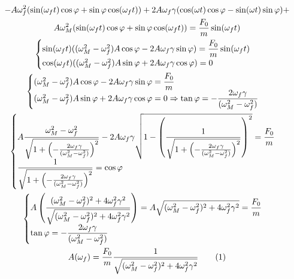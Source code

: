 \documentclass{article}
\numberwithin{equation}{subsection}
\begin{document}
\begin{gather*}
    -A\omega_f^{2}(\sin(\omega_f t)\cos\varphi+\sin\varphi \cos(\omega_f t))+
    2A\omega_f\gamma(\cos(\omega t)\cos\varphi-\sin(\omega t)\sin\varphi)+\\
    A\omega_M^{2}(\sin(\omega_f t)\cos\varphi+\sin\varphi \cos(\omega_f t))=\displaystyle\frac{F_0}{m}\sin(\omega_f t)\\
    \begin{cases}
        \sin(\omega_f t)((\omega_M^{2}-\omega_f^{2})A\cos\varphi-2A\omega_f\gamma \sin\varphi)=\displaystyle\frac{F_0}{m}\sin(\omega_f t)\\
        \cos(\omega_f t)((\omega_M^{2}-\omega_f^{2})A\sin\varphi+2A\omega_f\gamma \cos\varphi)=0
    \end{cases}\\
    \begin{cases}
        (\omega_M^{2}-\omega_f^{2})A\cos\varphi-2A\omega_f\gamma \sin\varphi=\displaystyle\frac{F_0}{m}\\
        (\omega_M^{2}-\omega_f^{2})A\sin\varphi+2A\omega_f\gamma \cos\varphi=0\Rightarrow\displaystyle \tan\varphi=-\frac{2\omega_f\gamma}{(\omega_M^{2}-\omega_f^{2})}
    \end{cases}\\
    \begin{cases}
        \displaystyle A\frac{\omega_M^{2}-\omega_f^{2}}{\sqrt{1+\left(-\frac{2\omega_f\gamma}{(\omega_M^{2}-\omega_f^{2})}\right)^{2}}}-2A\omega_f\gamma\sqrt{1-\left(\displaystyle\frac{1}{\sqrt{1+\left(-\frac{2\omega_f\gamma}{(\omega_M^{2}-\omega_f^{2})}\right)^{2}}}\right)^{2}}=\frac{F_0}{m}\\
        \displaystyle\frac{1}{\sqrt{1+\left(-\frac{2\omega_f\gamma}{(\omega_M^{2}-\omega_f^{2})}\right)^{2}}}=\cos\varphi
    \end{cases}\\
    \begin{cases}
        A\left(\displaystyle\frac{(\omega_M^{2}-\omega_f^{2})^{2}+4\omega_f^{2}\gamma^{2}}{\sqrt{(\omega_M^{2}-\omega_f^{2})^{2}+4\omega_f^{2}\gamma^{2}}}\right)=A\sqrt{(\omega_M^{2}-\omega_f^{2})^{2}+4\omega_f^{2}\gamma^{2}}=\displaystyle\frac{F_0}{m} \\
        \tan\varphi=-\displaystyle\frac{2\omega_f\gamma}{(\omega_M^{2}-\omega_f^{2})}
    \end{cases}\\
    A(\omega_f)=\frac{F_0}{m}\frac{1}{\sqrt{(\omega_M^{2}-\omega_f^{2})^{2}+4\omega_f^{2}\gamma^{2}}}\tag{\stepcounter{equation}\theequation}
\end{gather*}
\end{document}
